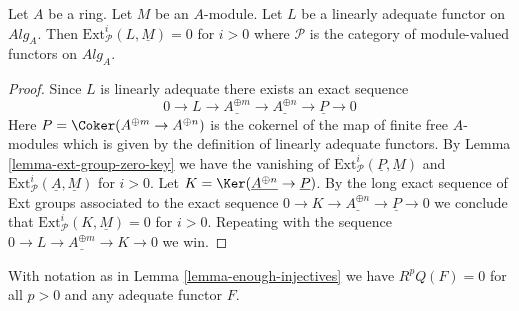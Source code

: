 \begin{lemma}
\label{lemma-ext-group-zero}
Let $A$ be a ring. Let $M$ be an $A$-module. Let $L$ be a linearly
adequate functor on $\textit{Alg}_A$. Then
$\text{Ext}^i_\mathcal{P}(L, \underline{M}) = 0$
for $i > 0$ where $\mathcal{P}$ is the category of module-valued
functors on $\textit{Alg}_A$.
\end{lemma}

\begin{proof}
Since $L$ is linearly adequate there exists an exact sequence
$$
0 \to L \to \underline{A^{\oplus m}} \to \underline{A^{\oplus n}} \to
\underline{P} \to 0
$$
Here $P = \Coker(A^{\oplus m} \to A^{\oplus n})$ is the cokernel
of the map of finite free $A$-modules which is given by the definition
of linearly adequate functors. By
Lemma \ref{lemma-ext-group-zero-key}
we have the vanishing of
$\text{Ext}^i_\mathcal{P}(\underline{P}, \underline{M})$
and
$\text{Ext}^i_\mathcal{P}(\underline{A}, \underline{M})$
for $i > 0$.
Let $K = \Ker(\underline{A^{\oplus n}} \to \underline{P})$.
By the long exact sequence of Ext groups associated to the exact sequence
$0 \to K \to \underline{A^{\oplus n}} \to \underline{P} \to 0$
we conclude that
$\text{Ext}^i_\mathcal{P}(K, \underline{M}) = 0$ for $i > 0$.
Repeating with the sequence
$0 \to L \to \underline{A^{\oplus m}} \to K \to 0$
we win.
\end{proof}

\begin{lemma}
\label{lemma-RQ-zero}
With notation as in
Lemma \ref{lemma-enough-injectives}
we have $R^pQ(F) = 0$ for all $p > 0$ and any adequate functor $F$.
\end{lemma}

